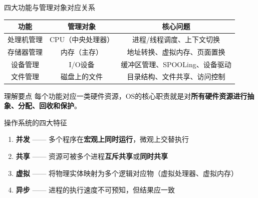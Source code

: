 \documentclass[10pt, aspectratio=169]{beamer}
\begin{document}
\begin{frame}{四大功能与管理对象对应关系}
    \begin{table}
        \centering
        \begin{tabular}{|c|c|c|}
            \hline
            \textbf{功能} & \textbf{管理对象} & \textbf{核心问题} \\
            \hline
            处理机管理 & CPU（中央处理器） & 进程/线程调度、上下文切换 \\
            \hline
            存储器管理 & 内存（主存） & 地址转换、虚拟内存、页面置换 \\
            \hline
            设备管理 & I/O设备 & 缓冲区管理、SPOOLing、设备驱动 \\
            \hline
            文件管理 & 磁盘上的文件 & 目录结构、文件共享、访问控制 \\
            \hline
        \end{tabular}
    \end{table}
    \vspace{0.5em}
    \begin{block}{理解要点}
        每个功能对应一类硬件资源，OS的核心职责就是对\textbf{所有硬件资源进行抽象、分配、回收和保护}。
    \end{block}
\end{frame}

\begin{frame}{操作系统的四大特征}
    \begin{enumerate}
        \item \textbf{并发} —— 多个程序在\textbf{宏观上同时运行}，微观上交替执行
        \item \textbf{共享} —— 资源可被多个进程\textbf{互斥共享}或\textbf{同时共享}
        \item \textbf{虚拟} —— 将物理实体映射为多个逻辑对应物（虚拟处理器、虚拟内存）
        \item \textbf{异步} —— 进程的执行速度不可预知，但结果应一致
    \end{enumerate}
\end{frame}
\end{document}
